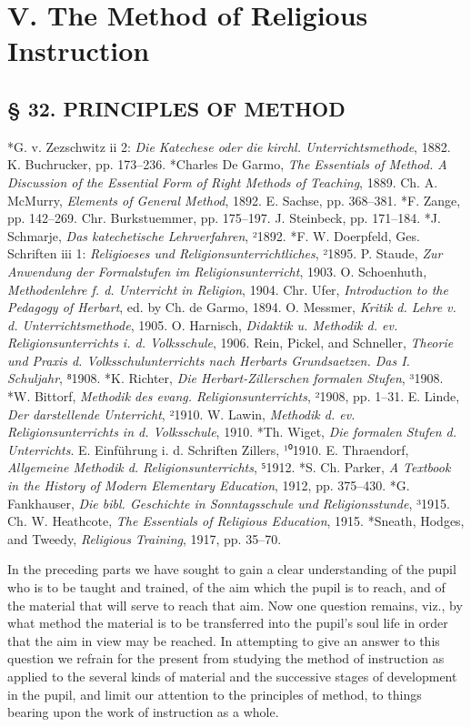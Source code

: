 \part{V. The Method of Religious Instruction}

\chapter{§ 32. PRINCIPLES OF METHOD}

*G. v. Zezschwitz ii 2: \emph{Die Katechese oder die kirchl. Unterrichtsmethode}, 1882. K. Buchrucker, pp. 173–236. *Charles De Garmo, \emph{The Essentials of Method. A Discussion of the Essential Form of Right Methods of Teaching}, 1889. Ch. A. McMurry, \emph{Elements of General Method}, 1892. E. Sachse, pp. 368–381. *F. Zange, pp. 142–269. Chr. Burkstuemmer, pp. 175–197. J. Steinbeck, pp. 171–184. *J. Schmarje, \emph{Das katechetische Lehrverfahren}, ²1892. *F. W. Doerpfeld, Ges. Schriften iii 1: \emph{Religioeses und Religionsunterrichtliches}, ²1895. P. Staude, \emph{Zur Anwendung der Formalstufen im Religionsunterricht}, 1903. O. Schoenhuth, \emph{Methodenlehre f. d. Unterricht in Religion}, 1904. Chr. Ufer, \emph{Introduction to the Pedagogy of Herbart}, ed. by Ch. de Garmo, 1894. O. Messmer, \emph{Kritik d. Lehre v. d. Unterrichtsmethode}, 1905. O. Harnisch, \emph{Didaktik u. Methodik d. ev. Religionsunterrichts i. d. Volksschule}, 1906. Rein, Pickel, and Schneller, \emph{Theorie und Praxis d. Volksschulunterrichts nach Herbarts Grundsaetzen. Das I. Schuljahr}, ⁸1908. *K. Richter, \emph{Die Herbart-Zillerschen formalen Stufen}, ³1908. *W. Bittorf, \emph{Methodik des evang. Religionsunterrichts}, ²1908, pp. 1–31. E. Linde, \emph{Der darstellende Unterricht}, ²1910. W. Lawin, \emph{Methodik d. ev. Religionsunterrichts in d. Volksschule}, 1910. *Th. Wiget, \emph{Die formalen Stufen d. Unterrichts}. E. Einführung i. d. Schriften Zillers, ¹⁰1910. E. Thraendorf, \emph{Allgemeine Methodik d. Religionsunterrichts}, ⁵1912. *S. Ch. Parker, \emph{A Textbook in the History of Modern Elementary Education}, 1912, pp. 375–430. *G. Fankhauser, \emph{Die bibl. Geschichte in Sonntagsschule und Religionsstunde}, ³1915. Ch. W. Heathcote, \emph{The Essentials of Religious Education}, 1915. *Sneath, Hodges, and Tweedy, \emph{Religious Training}, 1917, pp. 35–70.

In the preceding parts we have sought to gain a clear understanding of the pupil who is to be taught and trained, of the aim which the pupil is to reach, and of the material that will serve to reach that aim. Now one question remains, viz., by what method the material is to be transferred into the pupil’s soul life in order that the aim in view may be reached. In attempting to give an answer to this question we refrain for the present from studying the method of
instruction as applied to the several kinds of material and the successive stages of development in the pupil, and limit our attention to the principles of method, to things bearing upon the work of instruction as a whole.

